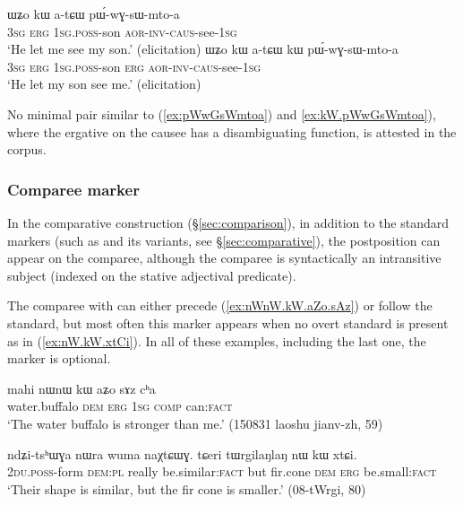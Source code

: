 \begin{exe}
\ex
\begin{xlist}
\ex \label{ex:pWwGsWmtoa}
 \gll ɯʑo kɯ a-tɕɯ pɯ́-wɣ-sɯ-mto-a \\
\textsc{3sg} \textsc{erg} \textsc{1sg}.\textsc{poss}-son  \textsc{aor}-\textsc{inv}-\textsc{caus}-see-\textsc{1sg} \\
\glt `He let me see my son.' (elicitation)
\ex \label{ex:kW.pWwGsWmtoa}
 \gll ɯʑo kɯ a-tɕɯ kɯ pɯ́-wɣ-sɯ-mto-a \\
\textsc{3sg} \textsc{erg} \textsc{1sg}.\textsc{poss}-son \textsc{erg} \textsc{aor}-\textsc{inv}-\textsc{caus}-see-\textsc{1sg} \\
\glt `He let my son see me.' (elicitation)
\end{xlist}
\end{exe}

No minimal pair similar to (\ref{ex:pWwGsWmtoa}) and \ref{ex:kW.pWwGsWmtoa}), where the ergative on the causee has a disambiguating function, is attested in the corpus.


\subsubsection{Comparee marker} \label{sec:comparee.kW}
In the comparative construction (§\ref{sec:comparison}), in addition to the standard markers (such as  and its variants, see §\ref{sec:comparative}), the postposition  can appear on the comparee, although the comparee is syntactically an intransitive subject  (indexed on the stative adjectival predicate). 

The comparee with   can either precede (\ref{ex:nWnW.kW.aZo.sAz}) or follow the standard, but most often this marker appears when no overt standard is present as in (\ref{ex:nW.kW.xtCi}). In all of these examples, including the last one, the marker    is optional.

\begin{exe}
\ex \label{ex:nWnW.kW.aZo.sAz}
 \gll mahi nɯnɯ kɯ aʑo sɤz cʰa \\ 
water.buffalo \textsc{dem} \textsc{erg} \textsc{1sg} \textsc{comp} can:\textsc{fact} \\ 
\glt `The water buffalo is stronger than me.'  (150831 laoshu jianv-zh, 59)
\end{exe}

\begin{exe}
\ex \label{ex:nW.kW.xtCi}
\gll ndʑi-tsʰɯɣa nɯra wuma naχtɕɯɣ. tɕeri tɯrgilaŋlaŋ nɯ kɯ xtɕi. \\
\textsc{2du}.\textsc{poss}-form \textsc{dem}:\textsc{pl} really be.similar:\textsc{fact} but fir.cone \textsc{dem} \textsc{erg} be.small:\textsc{fact} \\
\glt  `Their shape is similar, but the fir cone is smaller.' (08-tWrgi, 80)
\end{exe}

